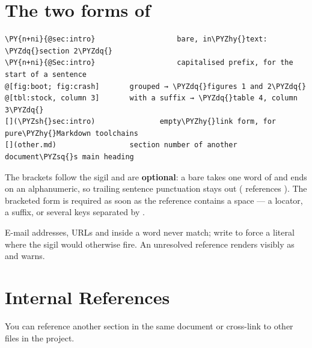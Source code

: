 \documentclass[a4paper,twoside]{article}
\begin{document}
\section{The two forms of }
\begin{tscode}[lang=md, engine=pygments]
\begin{Verbatim}[commandchars=\\\{\},breaklines, breakanywhere, commandchars=\\\{\}]
\PY{n+ni}{@sec:intro}                   bare, in\PYZhy{}text: \PYZdq{}section 2\PYZdq{}
\PY{n+ni}{@Sec:intro}                   capitalised prefix, for the start of a sentence
@[fig:boot; fig:crash]       grouped → \PYZdq{}figures 1 and 2\PYZdq{}
@[tbl:stock, column 3]       with a suffix → \PYZdq{}table 4, column 3\PYZdq{}
[](\PYZsh{}sec:intro)               empty\PYZhy{}link form, for pure\PYZhy{}Markdown toolchains
[](other.md)                 section number of another document\PYZsq{}s main heading
\end{Verbatim}
\end{tscode}
The brackets follow the sigil and are \textbf{optional}: a bare  takes one word
of  and ends on an alphanumeric, so trailing sentence
punctuation stays out ( references ). The
bracketed form is required as soon as the reference contains a space --- a
locator, a suffix, or several keys separated by \tscodeinline{;}.

E-mail addresses, URLs and  inside a word never match; write  to force a
literal  where the sigil would otherwise fire. An unresolved reference
renders visibly as \tscodeinline{[?key]} and warns.
\section{Internal References}
You can reference another section in the same document or cross-link to other files in the project.
\end{document}
